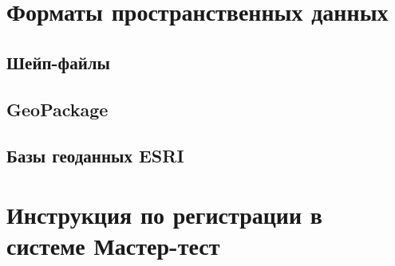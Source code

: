 \documentclass[
  12pt,
]{book}
\begin{document}
\hypertarget{appendix-ux441ux43fux440ux430ux432ux43eux447ux43dux44bux435-ux441ux432ux435ux434ux435ux43dux438ux44f}{%
\appendix}


\hypertarget{manual-catalog}{%
\chapter{Форматы пространственных данных}\label{manual-catalog}}

\hypertarget{ux448ux435ux439ux43f-ux444ux430ux439ux43bux44b}{%
\section{Шейп-файлы}\label{ux448ux435ux439ux43f-ux444ux430ux439ux43bux44b}}

\hypertarget{geopackage}{%
\section{GeoPackage}\label{geopackage}}

\hypertarget{ux431ux430ux437ux44b-ux433ux435ux43eux434ux430ux43dux43dux44bux445-esri}{%
\section{Базы геоданных ESRI}\label{ux431ux430ux437ux44b-ux433ux435ux43eux434ux430ux43dux43dux44bux445-esri}}

\hypertarget{mastertest}{%
\chapter{Инструкция по регистрации в системе Мастер-тест}\label{mastertest}}
\end{document}
